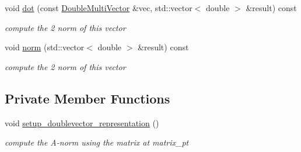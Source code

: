 \begin{DoxyCompactItemize}
void \hyperlink{classoomph_1_1DoubleMultiVector_a873f053a08f9d52537c5cb6077bfef7d}{dot} (const \hyperlink{classoomph_1_1DoubleMultiVector}{Double\+Multi\+Vector} \&vec, std\+::vector$<$ double $>$ \&result) const
\begin{DoxyCompactList}\small\item\em compute the 2 norm of this vector \end{DoxyCompactList}\item 
void \hyperlink{classoomph_1_1DoubleMultiVector_a886c01ce65486490e3b3d38389182566}{norm} (std\+::vector$<$ double $>$ \&result) const
\begin{DoxyCompactList}\small\item\em compute the 2 norm of this vector \end{DoxyCompactList}\end{DoxyCompactItemize}
\subsection*{Private Member Functions}
\begin{DoxyCompactItemize}
\item 
void \hyperlink{classoomph_1_1DoubleMultiVector_a09b97b4d4c7d0945178e8bf190813cdd}{setup\+\_\+doublevector\+\_\+representation} ()
\begin{DoxyCompactList}\small\item\em compute the A-\/norm using the matrix at matrix\+\_\+pt \end{DoxyCompactList}\end{DoxyCompactItemize}
